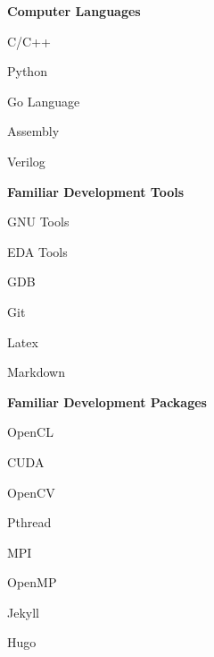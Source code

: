 \documentclass[a4paper,12pt,final]{memoir}
\newcommand{\Sep}{\vspace{1.5em}}
\newcommand{\SmallSep}{\vspace{0.5em}}
\newcommand{\CVSection}[1]
	{\Large\textbf{#1}\par
	\SmallSep\normalsize\normalfont}
\newcommand{\CVItem}[1]
	{\textbf{\color{RoyalBlue} #1}}
\begin{document}
\CVItem{Computer Languages}
\begin{multicols}{3}
\begin{compactitem}[\color{RoyalBlue}$\circ$]
	\item C/C++ 
	\item Python 
	\item Go Language
	\item Assembly
	\item Verilog
\end{compactitem}
\end{multicols}
\SmallSep
\CVItem{Familiar Development Tools}
\begin{multicols}{3}
\begin{compactitem}[\color{RoyalBlue}$\circ$]
	\item GNU Tools
	\item EDA Tools
	\item GDB
	\item Git
	\item Latex
	\item Markdown
\end{compactitem}
\end{multicols}
\CVItem{Familiar Development Packages}
\begin{multicols}{3}
\begin{compactitem}[\color{RoyalBlue}$\circ$]
	\item OpenCL
	\item CUDA
	\item OpenCV
	\item Pthread
	\item MPI
	\item OpenMP
	\item Jekyll
	\item Hugo
\end{compactitem}
\end{multicols}
\Sep 




\end{document}
